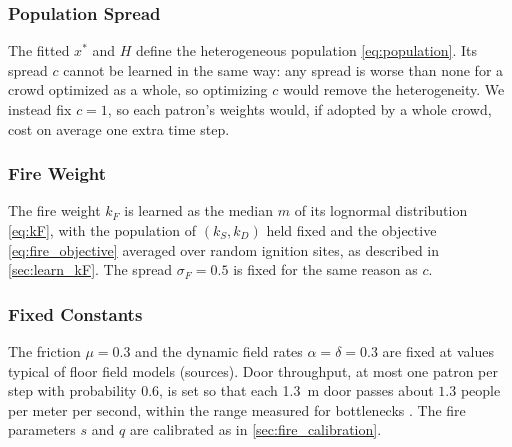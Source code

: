 \documentclass[14pt]{article}
\theoremstyle{definition}
\begin{document}
\subsubsection{Population Spread}\label{sec:population_spread}

The fitted $x^*$ and $H$ define the heterogeneous population
\cref{eq:population}. Its spread $c$ cannot be learned in the same way: any spread is
worse than none for a crowd optimized as a whole, so optimizing $c$ would remove the
heterogeneity. We instead fix $c = 1$, so each patron's weights would, if adopted by a
whole crowd, cost on average one extra time step.

\subsubsection{Fire Weight}\label{sec:learn_kF_method}

The fire weight $k_F$ is learned as the median $m$ of its lognormal distribution
\cref{eq:kF}, with the population of $(k_S, k_D)$ held fixed and the objective
\cref{eq:fire_objective} averaged over random ignition sites, as described in
\cref{sec:learn_kF}. The spread $\sigma_F = 0.5$ is fixed for the same reason as $c$.

\subsubsection{Fixed Constants}\label{sec:fixed_constants}

The friction $\mu = 0.3$ and the dynamic field rates $\alpha = \delta = 0.3$ are fixed
at values typical of floor field models (sources). Door throughput, at most one patron
per step with probability $0.6$, is set so that each \SI{1.3}{m} door passes about
$1.3$ people per meter per second, within the range measured for bottlenecks
\cite{seyfried}. The fire parameters $s$ and $q$ are calibrated as in
\cref{sec:fire_calibration}.
\end{document}
